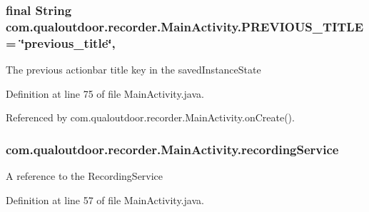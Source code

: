 \hypertarget{classcom_1_1qualoutdoor_1_1recorder_1_1MainActivity_a7e719523b166c40d53fb8589b04587ab}{
\subsubsection[{P\-R\-E\-V\-I\-O\-U\-S\-\_\-\-T\-I\-T\-L\-E}]{\setlength{\rightskip}{0pt plus 5cm}final String com.\-qualoutdoor.\-recorder.\-Main\-Activity.\-P\-R\-E\-V\-I\-O\-U\-S\-\_\-\-T\-I\-T\-L\-E = \char`\"{}previous\-\_\-title\char`\"{}\hspace{0.3cm}{\ttfamily [static]}, {\ttfamily [private]}}}\label{classcom_1_1qualoutdoor_1_1recorder_1_1MainActivity_a7e719523b166c40d53fb8589b04587ab}
The previous actionbar title key in the saved\-Instance\-State 

Definition at line 75 of file Main\-Activity.\-java.



Referenced by com.\-qualoutdoor.\-recorder.\-Main\-Activity.\-on\-Create().

\hypertarget{classcom_1_1qualoutdoor_1_1recorder_1_1MainActivity_af38fdbc2c5b036977d4e0c25d817d736}{
\subsubsection[{recording\-Service}]{ com.\-qualoutdoor.\-recorder.\-Main\-Activity.\-recording\-Service\hspace{0.3cm}{\ttfamily [private]}}}\label{classcom_1_1qualoutdoor_1_1recorder_1_1MainActivity_af38fdbc2c5b036977d4e0c25d817d736}
A reference to the Recording\-Service 

Definition at line 57 of file Main\-Activity.\-java.

